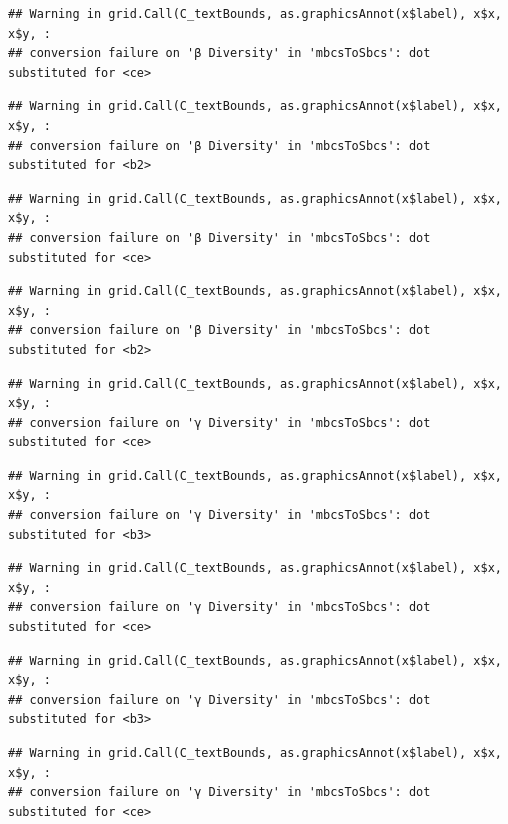 \documentclass[
]{article}
\begin{document}
\begin{verbatim}
## Warning in grid.Call(C_textBounds, as.graphicsAnnot(x$label), x$x, x$y, :
## conversion failure on 'β Diversity' in 'mbcsToSbcs': dot substituted for <ce>
\end{verbatim}

\begin{verbatim}
## Warning in grid.Call(C_textBounds, as.graphicsAnnot(x$label), x$x, x$y, :
## conversion failure on 'β Diversity' in 'mbcsToSbcs': dot substituted for <b2>
\end{verbatim}

\begin{verbatim}
## Warning in grid.Call(C_textBounds, as.graphicsAnnot(x$label), x$x, x$y, :
## conversion failure on 'β Diversity' in 'mbcsToSbcs': dot substituted for <ce>
\end{verbatim}

\begin{verbatim}
## Warning in grid.Call(C_textBounds, as.graphicsAnnot(x$label), x$x, x$y, :
## conversion failure on 'β Diversity' in 'mbcsToSbcs': dot substituted for <b2>
\end{verbatim}

\begin{verbatim}
## Warning in grid.Call(C_textBounds, as.graphicsAnnot(x$label), x$x, x$y, :
## conversion failure on 'γ Diversity' in 'mbcsToSbcs': dot substituted for <ce>
\end{verbatim}

\begin{verbatim}
## Warning in grid.Call(C_textBounds, as.graphicsAnnot(x$label), x$x, x$y, :
## conversion failure on 'γ Diversity' in 'mbcsToSbcs': dot substituted for <b3>
\end{verbatim}

\begin{verbatim}
## Warning in grid.Call(C_textBounds, as.graphicsAnnot(x$label), x$x, x$y, :
## conversion failure on 'γ Diversity' in 'mbcsToSbcs': dot substituted for <ce>
\end{verbatim}

\begin{verbatim}
## Warning in grid.Call(C_textBounds, as.graphicsAnnot(x$label), x$x, x$y, :
## conversion failure on 'γ Diversity' in 'mbcsToSbcs': dot substituted for <b3>
\end{verbatim}

\begin{verbatim}
## Warning in grid.Call(C_textBounds, as.graphicsAnnot(x$label), x$x, x$y, :
## conversion failure on 'γ Diversity' in 'mbcsToSbcs': dot substituted for <ce>
\end{verbatim}
\end{document}
